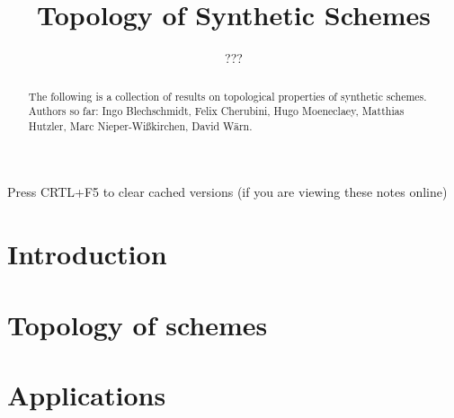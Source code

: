 \documentclass{../util/zariski}
\title{Topology of Synthetic Schemes}
\author{???}
\begin{document}
\maketitle

\begin{center}
  \color{purple}
  \large{Press CRTL+F5 to clear cached versions}
  \large{(if you are viewing these notes online)}
\end{center}

\begin{abstract}
  The following is a collection of results on topological properties of synthetic schemes.
  Authors so far: Ingo Blechschmidt, Felix Cherubini, Hugo Moeneclaey, Matthias Hutzler, Marc Nieper-Wißkirchen, David Wärn.
\end{abstract}

\tableofcontents

\section*{Introduction}


\section{Topology of schemes}


\section{Applications}


\printindex

\printbibliography
\end{document}
